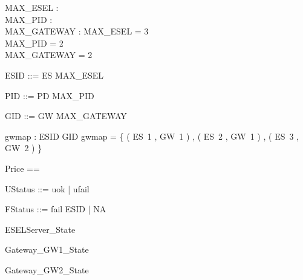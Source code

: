 \documentclass{article}
\begin{document}

\begin{axdef}
	MAX\_ESEL : \nat \\
 MAX\_PID : \nat \\
 MAX\_GATEWAY : \nat 
\where
 MAX\_ESEL = 3 \\
 MAX\_PID = 2 \\
 MAX\_GATEWAY = 2
\end{axdef}

\begin{zed}
	ESID ::= ES  \upto MAX\_ESEL \rdata
\end{zed}

\begin{zed}
	PID ::= PD  \upto MAX\_PID \rdata
\end{zed}

\begin{zed}
	GID ::= GW  \upto MAX\_GATEWAY \rdata
\end{zed}

\begin{axdef}
	gwmap : ESID \fun GID 
\where
 gwmap = \{ ( ES~1 , GW~1 ) , ( ES~2 , GW~1 ) , ( ES~3 , GW~2 ) \}
\end{axdef}

\begin{zed}
	Price == \nat
\end{zed}

\begin{zed}
	UStatus ::= uok | ufail
\end{zed}

\begin{zed}
	FStatus ::= fail \ldata ESID \rdata | NA
\end{zed}

\begin{zed}
	ESELServer\_State 
\end{zed}

\begin{zed}
	Gateway\_GW1\_State 
\end{zed}

\begin{zed}
	Gateway\_GW2\_State 
\end{zed}
\end{document}
